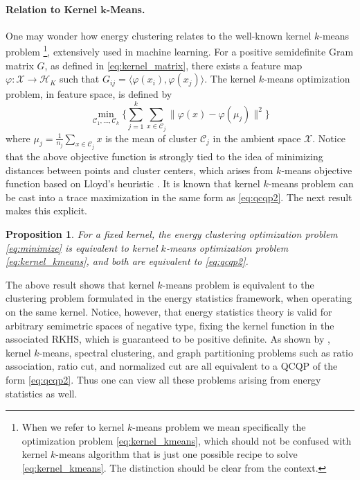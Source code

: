 \documentclass[twoside]{article}
\newtheorem{proposition}[theorem]{Proposition}
\newcommand\kk{K}
\newcommand\HH{\mathcal{H}}
\newcommand\C{{\mathcal{C}}}
\begin{document}
\paragraph{Relation to Kernel $\bm{k}$-Means.}
One may wonder how energy clustering 
relates to the well-known kernel $k$-means problem%
\footnote{When we refer to kernel $k$-means problem we mean specifically 
the optimization problem \eqref{eq:kernel_kmeans}, which should not be 
confused with kernel $k$-means algorithm that is just one possible recipe 
to solve \eqref{eq:kernel_kmeans}. The distinction should be clear from 
the context.}, 
extensively used in machine learning.
For a positive semidefinite Gram matrix $G$, as defined in
\eqref{eq:kernel_matrix},
there exists a feature map
$\varphi: \mathcal{X} \to \HH_\kk$ such that
$G_{ij} = \langle \varphi(x_i), \varphi(x_j) \rangle$. 
The kernel $k$-means optimization
problem,
in feature space,
is defined by
\begin{equation}
\label{eq:kernel_kmeans}
\min_{\C_1,\dotsc,\C_k}\bigg\{ 
\sum_{j=1}^k
\sum_{x \in \C_j} \| \varphi(x) - \varphi(\mu_j) \|^2
\bigg\}
\end{equation}
where $\mu_j = \tfrac{1}{n_j} \sum_{x \in \C_j} x$ is the  mean of cluster
$\C_j$ in the ambient space $\mathcal{X}$. 
Notice that the above objective function
is strongly tied to the idea of minimizing distances between points
and cluster centers, which arises from $k$-means objective function based
on Lloyd's heuristic \citep{Lloyd}.
It is known \citep{Dhillon2,Dhillon}
that kernel $k$-means problem 
can be cast into a trace maximization in the same form as 
\eqref{eq:qcqp2}. The next result makes this explicit.

\begin{proposition}
\label{th:kernel_kmeans}
For a fixed kernel,
the energy clustering optimization problem
\eqref{eq:minimize} 
is equivalent to kernel $k$-means optimization problem
\eqref{eq:kernel_kmeans}, and both are equivalent to \eqref{eq:qcqp2}.
\end{proposition}

The above result shows that 
kernel $k$-means problem is equivalent to the clustering problem
formulated in the energy statistics framework, when operating on the same
kernel. Notice, however, that 
energy statistics theory is valid for arbitrary semimetric spaces of
negative type, fixing the kernel function in the associated RKHS, which
is guaranteed to be positive definite.
As shown by \citep{Dhillon2,Dhillon}, kernel $k$-means, spectral clustering,
and graph partitioning problems such as ratio association, ratio cut, and
normalized cut are all equivalent to a QCQP of the form \eqref{eq:qcqp2}.
Thus one can view all these problems arising from energy statistics as well.
\end{document}
